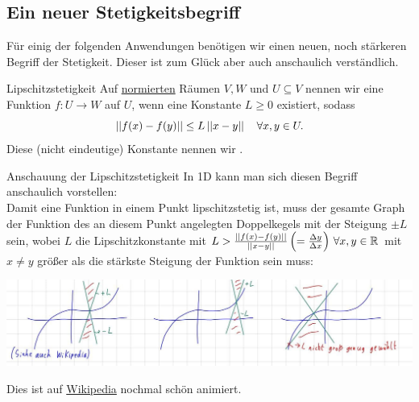 \subsection{Ein neuer Stetigkeitsbegriff}
Für einig der folgenden Anwendungen benötigen wir einen neuen, noch stärkeren Begriff der Stetigkeit. Dieser ist zum Glück aber auch anschaulich verständlich.
\begin{Def}
{Lipschitzstetigkeit}
Auf \underline{normierten} Räumen $V, W$ und $U\subseteq V$ nennen wir eine Funktion $f:U\to W$  auf $U$, wenn eine Konstante $L\geq 0$ existiert, sodass
\begin{equation*}
    \left|\left|f(x)-f(y)\right|\right|\leq L\left|\left|x-y\right|\right|\quad \forall x,y\in U.
\end{equation*}
Diese (nicht eindeutige) Konstante nennen wir .
\end{Def}
\begin{Beispiel}
{Anschauung der Lipschitzstetigkeit}
In 1D kann man sich diesen Begriff anschaulich vorstellen:\\
Damit eine Funktion in einem Punkt lipschitzstetig ist, muss der gesamte Graph der Funktion des an diesem Punkt angelegten Doppelkegels mit der Steigung $\pm L$ sein, wobei $L$ die Lipschitzkonstante mit $L>\frac{\left|\left|f(x)-f(y)\right|\right|}{\left|\left|x-y\right|\right|}\left({=\frac{\Delta y}{\Delta x}}\right)\,\forall x,y\in \mathbb{R}$ mit $x\neq y$ größer als die stärkste Steigung der Funktion sein muss:
\begin{center}
    \includegraphics[width=.8\textwidth]{Dateien/09/09Lipschitz.jpg}
\end{center}
Dies ist auf \href{https://de.wikipedia.org/wiki/Lipschitzstetigkeit}{Wikipedia} nochmal schön animiert.
\end{Beispiel}
